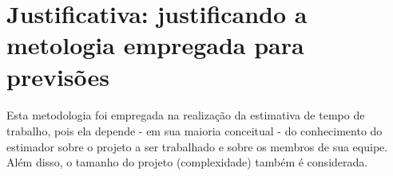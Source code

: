 \documentclass[12pt,a4paper]{article}
\begin{document}
	\section{Justificativa: justificando a metologia empregada para previsões}	
	
	\paragraph{} Esta metodologia foi empregada na realização da estimativa de tempo de trabalho, pois ela depende - em sua maioria conceitual - do conhecimento do estimador sobre o projeto a ser trabalhado e sobre os membros de sua equipe. Além disso, o tamanho do projeto (complexidade) também é considerada.
			
		
\end{document}

